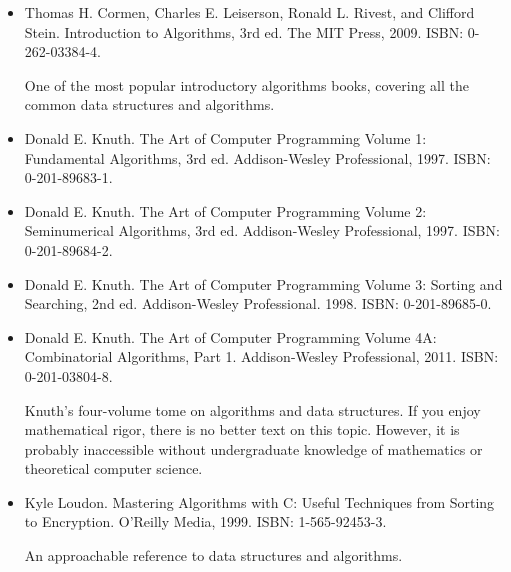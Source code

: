 \begin{itemize}
\item
Thomas H. Cormen, Charles E. Leiserson, Ronald L. Rivest, and Clifford Stein. Introduction to Algorithms, 3rd ed. The MIT Press, 2009. ISBN: 0-262-03384-4.

\hspace*{\fill}

One of the most popular introductory algorithms books, covering all the common data structures and algorithms.

\hspace*{\fill}

\item
Donald E. Knuth. The Art of Computer Programming Volume 1: Fundamental Algorithms, 3rd ed. Addison-Wesley Professional, 1997. ISBN: 0-201-89683-1.

\item
Donald E. Knuth. The Art of Computer Programming Volume 2: Seminumerical Algorithms, 3rd ed. Addison-Wesley Professional, 1997. ISBN: 0-201-89684-2.

\item
Donald E. Knuth. The Art of Computer Programming Volume 3: Sorting and Searching, 2nd ed. Addison-Wesley Professional. 1998. ISBN: 0-201-89685-0.

\item
Donald E. Knuth. The Art of Computer Programming Volume 4A: Combinatorial Algorithms, Part 1. Addison-Wesley Professional, 2011. ISBN: 0-201-03804-8.

\hspace*{\fill}

Knuth’s four-volume tome on algorithms and data structures. If you enjoy mathematical rigor, there is no better text on this topic. However, it is probably inaccessible without undergraduate knowledge of mathematics or theoretical computer science.

\hspace*{\fill}

\item
Kyle Loudon. Mastering Algorithms with C: Useful Techniques from Sorting to Encryption. O’Reilly Media, 1999. ISBN: 1-565-92453-3.

\hspace*{\fill}

An approachable reference to data structures and algorithms.
\end{itemize}